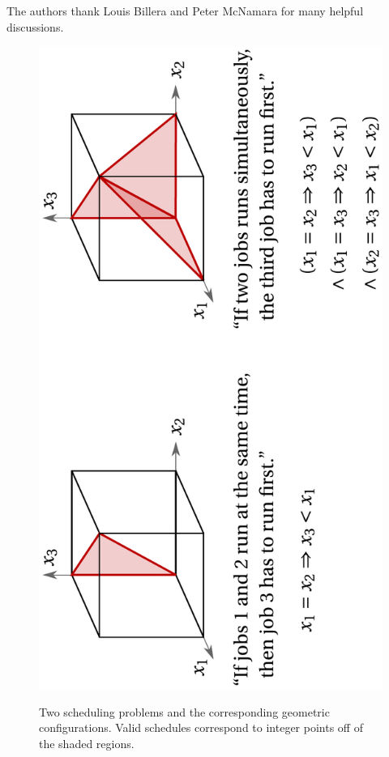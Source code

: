\documentclass[12pt,reqno]{amsart}
\numberwithin{definition}{section}
\theoremstyle{definition}
\begin{document}
The authors thank Louis Billera and Peter McNamara for many helpful discussions.









\begin{figure}[h]
\includegraphics[angle=270,width=4.5in]{schedule}
\label{fig:intro}
\caption{Two scheduling problems and the corresponding geometric configurations. 
  Valid schedules correspond to integer points off of the shaded regions. }
\end{figure}
\end{document}

